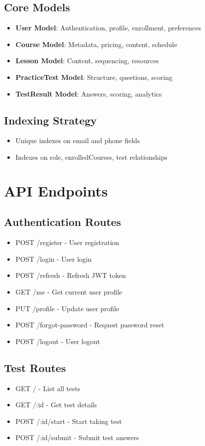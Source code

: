 \documentclass{article}
\begin{document}
\subsection{Core Models}
\begin{itemize}
    \item \textbf{User Model}: Authentication, profile, enrollment, preferences
    \item \textbf{Course Model}: Metadata, pricing, content, schedule
    \item \textbf{Lesson Model}: Content, sequencing, resources
    \item \textbf{PracticeTest Model}: Structure, questions, scoring
    \item \textbf{TestResult Model}: Answers, scoring, analytics
\end{itemize}

\subsection{Indexing Strategy}
\begin{itemize}
    \item Unique indexes on email and phone fields
    \item Indexes on role, enrolledCourses, test relationships
\end{itemize}

\section{API Endpoints}

\subsection{Authentication Routes}
\begin{itemize}
    \item POST /register - User registration
    \item POST /login - User login
    \item POST /refresh - Refresh JWT token
    \item GET /me - Get current user profile
    \item PUT /profile - Update user profile
    \item POST /forgot-password - Request password reset
    \item POST /logout - User logout
\end{itemize}

\subsection{Test Routes}
\begin{itemize}
    \item GET / - List all tests
    \item GET /:id - Get test details
    \item POST /:id/start - Start taking test
    \item POST /:id/submit - Submit test answers
\end{itemize}
\end{document}
